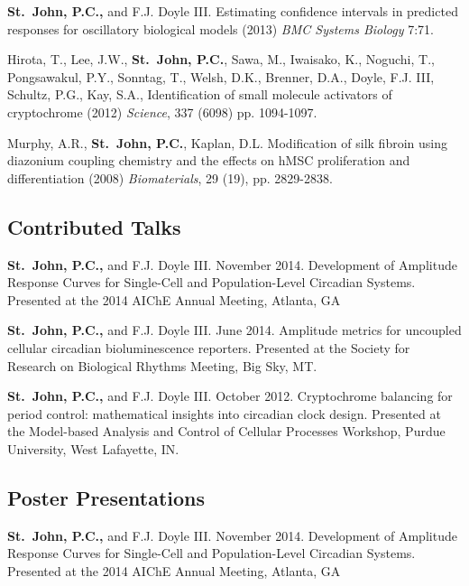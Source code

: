 {{\bfseries St.\ John, P.C.,} and F.J. Doyle III. Estimating confidence intervals in predicted responses for oscillatory biological models (2013) {\itshape BMC Systems Biology} 7:71.
 
Hirota, T., Lee, J.W., {\bfseries St.\ John, P.C.}, Sawa, M., Iwaisako, K.,
Noguchi, T., Pongsawakul, P.Y., Sonntag, T., Welsh, D.K., Brenner, D.A., Doyle,
F.J. III, Schultz, P.G., Kay, S.A.,  Identification of small molecule
activators of cryptochrome (2012) {\itshape Science}, 337 (6098) pp. 1094-1097.

Murphy, A.R., {\bf St.\ John, P.C.}, Kaplan, D.L. Modification of silk fibroin using diazonium coupling chemistry and the effects on hMSC proliferation and differentiation (2008) {\em Biomaterials}, 29 (19), pp. 2829-2838.  

\subsection*{Contributed Talks}
{\bfseries St.\ John, P.C.,} and F.J. Doyle III. November 2014. Development of Amplitude Response Curves for Single-Cell and Population-Level Circadian Systems. Presented at the 2014 AIChE Annual Meeting, Atlanta, GA


{\bfseries St.\ John, P.C.,} and F.J. Doyle III. June 2014. Amplitude metrics for uncoupled cellular circadian bioluminescence reporters. Presented at the Society for Research on Biological Rhythms Meeting, Big Sky, MT.

{\bfseries St.\ John, P.C.,} and F.J. Doyle III. October 2012. Cryptochrome balancing for period control: mathematical insights into circadian clock design. Presented at the Model-based Analysis and Control of Cellular Processes Workshop, Purdue University, West Lafayette, IN.

\subsection*{Poster Presentations}
{\bfseries St.\ John, P.C.,} and F.J. Doyle III. November 2014. Development of Amplitude Response Curves for Single-Cell and Population-Level Circadian Systems. Presented at the 2014 AIChE Annual Meeting, Atlanta, GA

}

